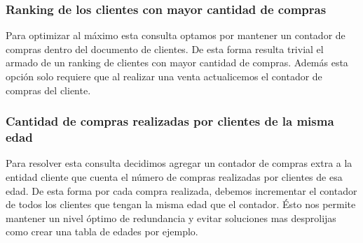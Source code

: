 \subsubsection{Ranking de los clientes con mayor cantidad de compras}

Para optimizar al m\'aximo esta consulta optamos por mantener un contador de compras dentro del documento de clientes. De esta forma resulta trivial el armado de un ranking de clientes con mayor cantidad de compras. Adem\'as esta opci\'on solo requiere que al realizar una venta actualicemos el contador de compras del cliente.

\subsubsection{Cantidad de compras realizadas por clientes de la misma edad}

Para resolver esta consulta decidimos agregar un contador de compras extra a la entidad cliente que cuenta el n\'umero de compras realizadas por clientes de esa edad. De esta forma por cada compra realizada, debemos incrementar el contador de todos los clientes que tengan la misma edad que el contador. \'Esto nos permite mantener un nivel \'optimo de redundancia y evitar soluciones mas desprolijas como crear una tabla de edades por ejemplo.


